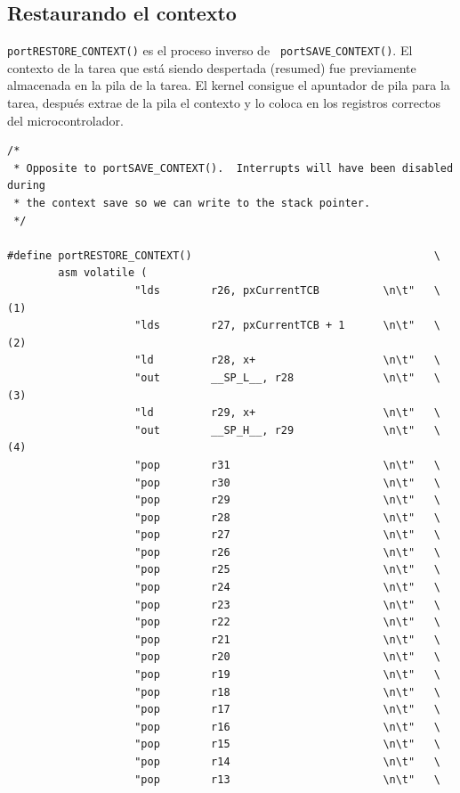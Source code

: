 \documentclass[12pt]{article}
\begin{document}
\subsection*{Restaurando el contexto}
{\tt portRESTORE$\_$CONTEXT()} es el proceso inverso de {\tt 
portSAVE$\_$CONTEXT()}. El contexto de la tarea que está siendo 
despertada (resumed) fue previamente almacenada en la pila de la tarea. 
El kernel consigue el apuntador de pila para la tarea, después extrae de 
la pila el contexto y lo coloca en los registros correctos del 
microcontrolador.
\begin{verbatim}
/* 
 * Opposite to portSAVE_CONTEXT().  Interrupts will have been disabled during
 * the context save so we can write to the stack pointer. 
 */

#define portRESTORE_CONTEXT()                                      \
        asm volatile (
                    "lds        r26, pxCurrentTCB          \n\t"   \ (1)
                    "lds        r27, pxCurrentTCB + 1      \n\t"   \ (2)
                    "ld	        r28, x+	                   \n\t"   \
                    "out        __SP_L__, r28              \n\t"   \ (3)
                    "ld	        r29, x+	                   \n\t"   \
                    "out        __SP_H__, r29              \n\t"   \ (4)
                    "pop        r31                        \n\t"   \
                    "pop        r30                        \n\t"   \
                    "pop        r29                        \n\t"   \
                    "pop        r28                        \n\t"   \
                    "pop        r27                        \n\t"   \
                    "pop        r26                        \n\t"   \
                    "pop        r25                        \n\t"   \
                    "pop        r24                        \n\t"   \
                    "pop        r23                        \n\t"   \
                    "pop        r22                        \n\t"   \
                    "pop        r21                        \n\t"   \
                    "pop        r20                        \n\t"   \
                    "pop        r19                        \n\t"   \
                    "pop        r18                        \n\t"   \
                    "pop        r17                        \n\t"   \
                    "pop        r16                        \n\t"   \
                    "pop        r15                        \n\t"   \
                    "pop        r14                        \n\t"   \
                    "pop        r13                        \n\t"   \

\end{verbatim}
\end{document}
